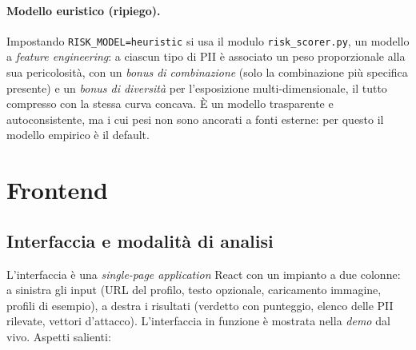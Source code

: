 \documentclass[11pt,a4paper]{article}
\begin{document}
\paragraph{Modello euristico (ripiego).} Impostando \texttt{RISK\_MODEL=heuristic} si usa
il modulo \texttt{risk\_scorer.py}, un modello a \emph{feature engineering}: a ciascun tipo
di PII è associato un peso proporzionale alla sua pericolosità, con un \emph{bonus di
combinazione} (solo la combinazione più specifica presente) e un \emph{bonus di diversità}
per l'esposizione multi-dimensionale, il tutto compresso con la stessa curva concava. È un
modello trasparente e autoconsistente, ma i cui pesi non sono ancorati a fonti esterne: per
questo il modello empirico è il default.

\section{Frontend}
\label{sec:fe}
\subsection{Interfaccia e modalità di analisi}
L'interfaccia è una \emph{single-page application} React con un impianto a due colonne:
a sinistra gli input (URL del profilo, testo opzionale, caricamento immagine, profili
di esempio), a destra i risultati (verdetto con punteggio, elenco delle PII rilevate,
vettori d'attacco). L'interfaccia in funzione è mostrata nella \emph{demo} dal vivo.
Aspetti salienti:
\end{document}
